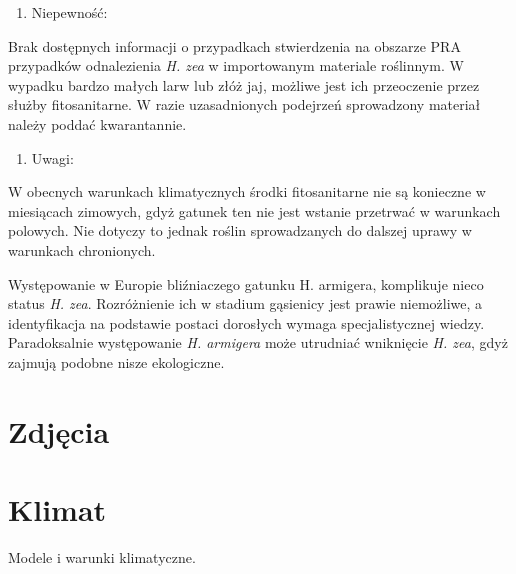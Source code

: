 \documentclass[polish,a4paper]{article}
\providecommand{\tightlist}{%
  \setlength{\itemsep}{0pt}\setlength{\parskip}{0pt}}
\begin{document}
\begin{enumerate}
\def\labelenumi{(\arabic{enumi})}
\setcounter{enumi}{17}
\tightlist
\item
  Niepewność:
\end{enumerate}

Brak dostępnych informacji o przypadkach stwierdzenia na obszarze PRA
przypadków odnalezienia \emph{H. zea} w importowanym materiale
roślinnym. W wypadku bardzo małych larw lub złóż jaj, możliwe jest ich
przeoczenie przez służby fitosanitarne. W razie uzasadnionych podejrzeń
sprowadzony materiał należy poddać kwarantannie.

\begin{enumerate}
\def\labelenumi{(\arabic{enumi})}
\setcounter{enumi}{18}
\tightlist
\item
  Uwagi:
\end{enumerate}

W obecnych warunkach klimatycznych środki fitosanitarne nie są konieczne
w miesiącach zimowych, gdyż gatunek ten nie jest wstanie przetrwać w
warunkach polowych. Nie dotyczy to jednak roślin sprowadzanych do
dalszej uprawy w warunkach chronionych.

Występowanie w Europie bliźniaczego gatunku H. armigera, komplikuje
nieco status \emph{H. zea}. Rozróżnienie ich w stadium gąsienicy jest
prawie niemożliwe, a identyfikacja na podstawie postaci dorosłych wymaga
specjalistycznej wiedzy. Paradoksalnie występowanie \emph{H. armigera}
może utrudniać wniknięcie \emph{H. zea}, gdyż zajmują podobne nisze
ekologiczne.

\appendix


\section{Zdjęcia}\label{zdjecia}

\section{Klimat}\label{klimat}

Modele i warunki klimatyczne.
\end{document}
